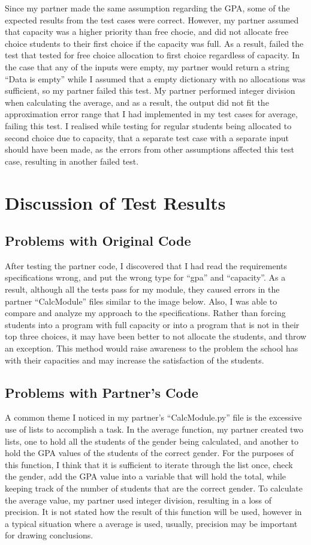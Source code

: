 \documentclass[12pt]{article}
\begin{document}
Since my partner made the same assumption regarding the GPA, some of the expected results from the test cases were correct. However, my partner assumed that capacity was a higher priority than free chocie, and did not allocate free choice students to their first choice if the capacity was full. As a result, failed the test that tested for free choice allocation to first choice regardless of capacity. In the case that any of the inputs were empty, my partner would return a string ``Data is empty'' while I assumed that a empty dictionary with no allocations was sufficient, so my partner failed this test. My partner performed integer division when calculating the average, and as a result, the output did not fit the approximation error range that I had implemented in my test cases for average, failing this test. I realised while testing for regular students being allocated to second choice due to capacity, that a separate test case with a separate input should have been made, as the errors from other assumptions affected this test case, resulting in another failed test.

\section{Discussion of Test Results}

\subsection{Problems with Original Code}
After testing the partner code, I discovered that I had read the requirements specifications wrong, and put the wrong type for ``gpa'' and ``capacity''. As a result, although all the tests pass for my module, they caused errors in the partner ``CalcModule'' files similar to the image below. Also, I was able to compare and analyze my approach to the specifications. Rather than forcing students into a program with full capacity or into a program that is not in their top three choices, it may have been better to not allocate the students, and throw an exception. This method would raise awareness to the problem the school has with their capacities and may increase the satisfaction of the students.

\subsection{Problems with Partner's Code}
A common theme I noticed in my partner's ``CalcModule.py'' file is the excessive use of lists to accomplish a task. In the average function, my partner created two lists, one to hold all the students of the gender being calculated, and another to hold the GPA values of the students of the correct gender. For the purposes of this function, I think that it is sufficient to iterate through the list once, check the gender, add the GPA value into a variable that will hold the total, while keeping track of the number of students that are the correct gender. To calculate the average value, my partner used integer division, resulting in a loss of precision. It is not stated how the result of this function will be used, however in a typical situation where a average is used, usually, precision may be important for drawing conclusions.
\end{document}
